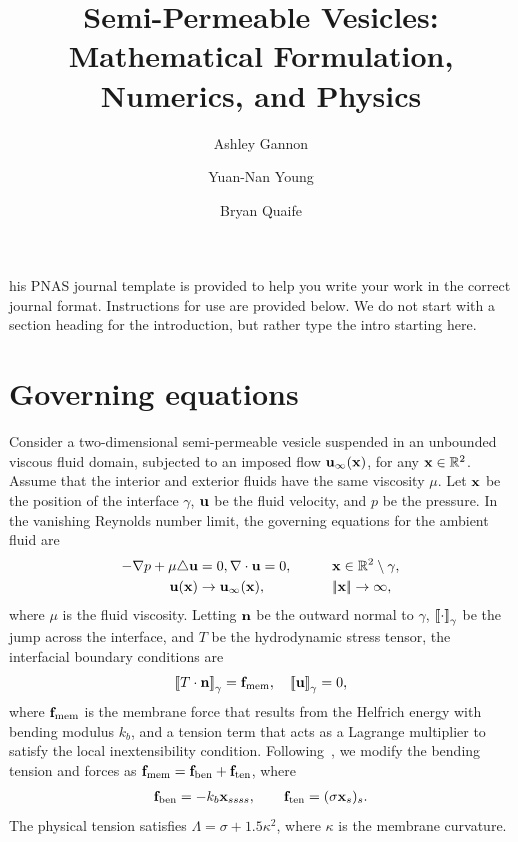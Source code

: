 \documentclass[9pt,twocolumn,twoside,lineno]{pnas-new}
\title{Semi-Permeable Vesicles: Mathematical Formulation, Numerics, and
Physics}
\author[a]{Ashley Gannon}
\author[b]{Yuan-Nan Young}
\author[a,1]{Bryan Quaife}
\affil[a]{Department of Scientific Computing, Florida State University}
\affil[b]{Department of Mathematical Sciences, New Jeresey Institute of
Technology}
\begin{document}
\maketitle
\thispagestyle{firststyle}


his PNAS journal template is provided to help you write your
work in the correct journal format. Instructions for use are provided
below. We do not start with a section heading for the introduction, but
rather type the intro starting here.

\section*{Governing equations} \label{sc:formulate}
Consider a two-dimensional semi-permeable vesicle suspended in an
unbounded viscous fluid domain, subjected to an imposed flow
$\mathbf{u}_\infty(\mathbf{x})$, for any $\mathbf{x} \in \mathbb{R}^2$.  Assume that the interior
and exterior fluids have the same viscosity $\mu$. Let $\mathbf{x}$ be the
position of the interface $\gamma$, $\mathbf{u}$ be the fluid velocity, and
$p$ be the pressure. In the vanishing Reynolds number limit, the
governing equations for the ambient fluid are
%
\begin{alignat}{3}
  \label{eqn:governing}
  -\nabla p + \mu \triangle \uu &= 0, 
  \nabla \cdot \uu = 0, \qquad &&\xx \in \RR^2 \setminus \gamma, \\
%
  \uu(\xx) &\rightarrow \uu_\infty(\xx),
    &&\norm{\xx} \rightarrow \infty,
\end{alignat}
where $\mu$ is the fluid viscosity. Letting $\mathbf{n}$ be the outward normal
to $\gamma$, $\left[\!\left[ \cdot \right]\!\right]_\gamma$ be the jump across the interface, and $T$ be
the hydrodynamic stress tensor, the interfacial boundary conditions are
\begin{align}
  \label{eqn:jump}
  \left[\!\left[ T\cdot\mathbf{n} \right]\!\right]_\gamma = \mathbf{f}_\mathrm{mem}, \quad \left[\!\left[ \mathbf{u} \right]\!\right]_\gamma = 0,
\end{align}
where $\mathbf{f}_\mathrm{mem}$ is the membrane force that results from the
Helfrich energy with bending modulus $k_b$, and a tension term that acts
as a Lagrange multiplier to satisfy the local inextensibility condition.
Following~\cite{vee-gue-zor-bir2009}, we modify the bending tension and
forces as
$\mathbf{f}_\mathrm{mem} = \mathbf{f}_\mathrm{ben} +
\mathbf{f}_\mathrm{ten}$, where
\begin{align}
  \label{eqn:membraneForces}
  \mathbf{f}_\mathrm{ben} = -k_b \mathbf{x}_{ssss}, \qquad
  \mathbf{f}_\mathrm{ten} = (\sigma \mathbf{x}_s)_s.
\end{align}
The physical tension satisfies $\Lambda = \sigma + 1.5 \kappa^2$, where
$\kappa$ is the membrane curvature.
\end{document}

